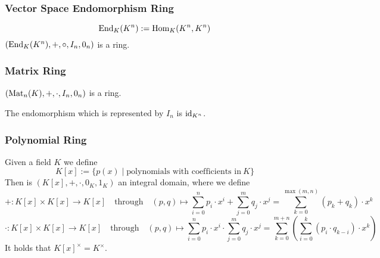 \subsubsection{Vector Space Endomorphism Ring}
\begin{proposition}
   \[\operatorname{End}_K(K^n) := \operatorname{Hom}_K(K^n, K^n)\]
   \((\operatorname{End}_K(K^n), +, \circ, I_n, 0_n)\) is a ring.
\end{proposition}

\subsubsection{Matrix Ring}
\begin{proposition}
   \((\operatorname{Mat}_n(K), +, \cdot, I_n, 0_n)\) is a ring.
\end{proposition}
\begin{remark}
   The endomorphism which is represented by \(I_n\) is \(\operatorname{id}_{K^n}\).
\end{remark}

\subsubsection{Polynomial Ring}
\begin{example}
   Given a field \(K\) we define
   \[K[x] := \{p(x) \mid \text{polynomials with coefficients in}~K\}\]
   Then is \((K[x], +, \cdot, 0_K, 1_K)\) an integral domain, where we define
   \[+: K[x] \times K[x] \to K[x] \quad\text{through}\quad (p, q) \mapsto \sum_{i=0}^n p_i \cdot x^i + \sum_{j=0}^m q_j \cdot x^j = \sum_{k=0}^{\max(m,n)} (p_k + q_k) \cdot x^k\]
   \[\cdot: K[x] \times K[x] \to K[x] \quad\text{through}\quad (p, q) \mapsto \sum_{i=0}^n p_i \cdot x^i \cdot \sum_{j=0}^m q_j \cdot x^j = \sum_{k=0}^{m+n} \left(\sum_{i=0}^k (p_i \cdot q_{k-i}) \cdot x^k\right)\]
   It holds that \(K[x]^{\times} = K^{\times}\).
\end{example}

